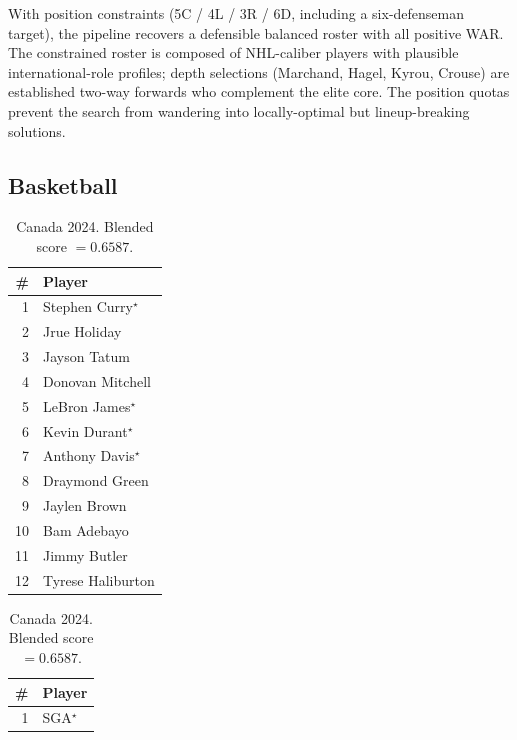 \documentclass[11pt,letterpaper]{article}
\begin{document}
With position constraints (5C / 4L / 3R / 6D, including a six-defenseman
target), the pipeline recovers a defensible balanced roster with all
positive WAR. The constrained roster is composed of NHL-caliber players
with plausible international-role profiles; depth selections
(Marchand, Hagel, Kyrou, Crouse) are established two-way forwards who
complement the elite core. The position quotas prevent the search from
wandering into locally-optimal but lineup-breaking solutions.

\subsection{Basketball}

\begin{table}[h]
  \centering \small
  \begin{minipage}{0.45\textwidth}
    \centering
    \caption*{USA 2024. Blended score $= 0.7418$.}
    \begin{tabular}{r l}
      \toprule
      \# & Player \\
      \midrule
      1  & Stephen Curry$^{\star}$       \\
      2  & Jrue Holiday                  \\
      3  & Jayson Tatum                  \\
      4  & Donovan Mitchell              \\
      5  & LeBron James$^{\star}$       \\
      6  & Kevin Durant$^{\star}$       \\
      7  & Anthony Davis$^{\star}$      \\
      8  & Draymond Green                \\
      9  & Jaylen Brown                  \\
      10 & Bam Adebayo                   \\
      11 & Jimmy Butler                  \\
      12 & Tyrese Haliburton             \\
      \bottomrule
    \end{tabular}
  \end{minipage}%
  \hfill
  \begin{minipage}{0.45\textwidth}
    \centering
    \caption*{Canada 2024. Blended score $= 0.6587$.}
    \begin{tabular}{r l}
      \toprule
      \# & Player \\
      \midrule
      1  & SGA$^{\star}$                    \\

\end{tabular}
\end{minipage}
\end{table}
\end{document}
